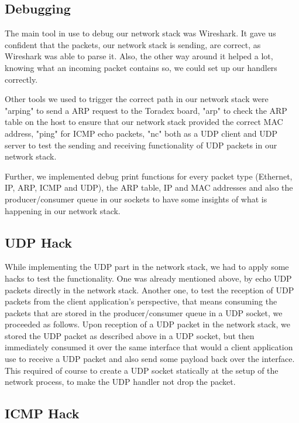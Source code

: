 \subsection{Debugging}

The main tool in use to debug our network stack was Wireshark. It gave us confident that the packets, our network stack is sending, are correct, as Wireshark was able to parse it. Also, the other way around it helped a lot, knowing what an incoming packet contains so, we could set up our handlers correctly.

Other tools we used to trigger the correct path in our network stack were "arping" to send a ARP request to the Toradex board, "arp" to check the ARP table on the host to ensure that our network stack provided the correct MAC address, "ping" for ICMP echo packets, "nc" both as a UDP client and UDP server to test the sending and receiving functionality of UDP packets in our network stack.

Further, we implemented debug print functions for every packet type (Ethernet, IP, ARP, ICMP and UDP), the ARP table, IP and MAC addresses and also the producer/consumer queue in our sockets to have some insights of what is happening in our network stack.

\subsection{UDP Hack}

While implementing the UDP part in the network stack, we had to apply some hacks to test the functionality. One was already mentioned above, by echo UDP packets directly in the network stack.
Another one, to test the reception of UDP packets from the client application's perspective, that means consuming the packets that are stored in the producer/consumer queue in a UDP socket, we proceeded as follows. Upon reception of a UDP packet in the network stack, we stored the UDP packet as described above in a UDP socket, but then immediately consumed it over the same interface that would a client application use to receive a UDP packet and also send some payload back over the interface. This required of course to create a UDP socket statically at the setup of the network process, to make the UDP handler not drop the packet.

\subsection{ICMP Hack}

